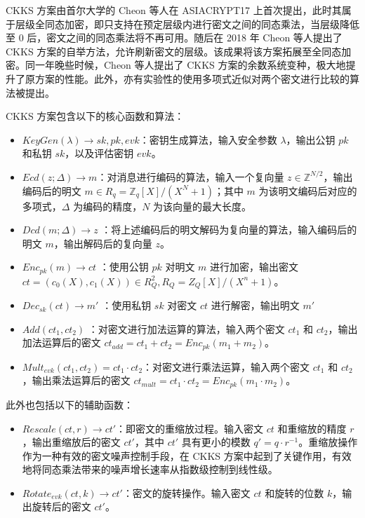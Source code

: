 CKKS 方案由首尔大学的 Cheon 等人在 ASIACRYPT17 上首次提出\cite{cryptoeprint:2016/421}，此时其属于层级全同态加密，即只支持在预定层级内进行密文之间的同态乘法，当层级降低至 0 后，密文之间的同态乘法将不再可用。随后在 2018 年 Cheon 等人提出了 CKKS 方案的自举方法\cite{cryptoeprint:2018/153}，允许刷新密文的层级。该成果将该方案拓展至全同态加密。同一年晚些时候，Cheon 等人提出了 CKKS 方案的余数系统变种，极大地提升了原方案的性能。\cite{cryptoeprint:2018/931}此外，亦有实验性的使用多项式近似对两个密文进行比较的算法被提出\cite{cryptoeprint:2019/417,cryptoeprint:2019/1234,cryptoeprint:2020/834}。

CKKS 方案包含以下的核心函数和算法：

\begin{itemize}
    \item $KeyGen(\lambda) \rightarrow sk, pk, evk$：密钥生成算法，输入安全参数 $\lambda$，输出公钥 $pk$ 和私钥 $sk$，以及评估密钥 $evk$。
    \item $Ecd(z; \Delta) \rightarrow m$：对消息进行编码的算法，输入一个复向量 $z \in \mathbb{Z}^{N/2}$，输出编码后的明文 $m \in R_q = \mathbb{Z}_q[X]/(X^N+1)$；其中 $m$ 为该明文编码后对应的多项式，$\Delta$ 为编码的精度，$N$ 为该向量的最大长度。
    \item $Dcd(m; \Delta) \rightarrow z$ ：将上述编码后的明文解码为复向量的算法，输入编码后的明文 $m$，输出解码后的复向量 $z$。
    \item $Enc_{pk}(m) \rightarrow ct$ ：使用公钥 $pk$ 对明文 $m$ 进行加密，输出密文 $ct = (c_0(X),c_1(X)) \in R_Q^2, R_Q = Z_Q[X]/(X^n + 1)$。
    \item $Dec_{sk}(ct) \rightarrow m'$ ：使用私钥 $sk$ 对密文 $ct$ 进行解密，输出明文 $m'$
    \item $Add(ct_1, ct_2)$ ：对密文进行加法运算的算法，输入两个密文 $ct_1$ 和 $ct_2$，输出加法运算后的密文 $ct_{add} = ct_1 + ct_2 = Enc_{pk}(m_1 + m_2)$。
    \item $Mult_{evk}(ct_1, ct_2) = ct_1 \cdot ct_2$：对密文进行乘法运算，输入两个密文 $ct_1$ 和 $ct_2$，输出乘法运算后的密文 $ct_{mult} = ct_1 \cdot ct_2 = Enc_{pk}(m_1 \cdot m_2)$。
\end{itemize}

此外也包括以下的辅助函数：

\begin{itemize}
    \item $Rescale(ct, r) \rightarrow ct'$：即密文的重缩放过程。输入密文 $ct$ 和重缩放的精度 $r$，输出重缩放后的密文 $ct'$，其中 $ct'$ 具有更小的模数 $q' = q \cdot r^{-1}$。重缩放操作作为一种有效的密文噪声控制手段，在 CKKS 方案中起到了关键作用，有效地将同态乘法带来的噪声增长速率从指数级控制到线性级。
    \item $Rotate_{evk}(ct, k) \rightarrow ct'$：密文的旋转操作。输入密文 $ct$ 和旋转的位数 $k$，输出旋转后的密文 $ct'$。
\end{itemize}

